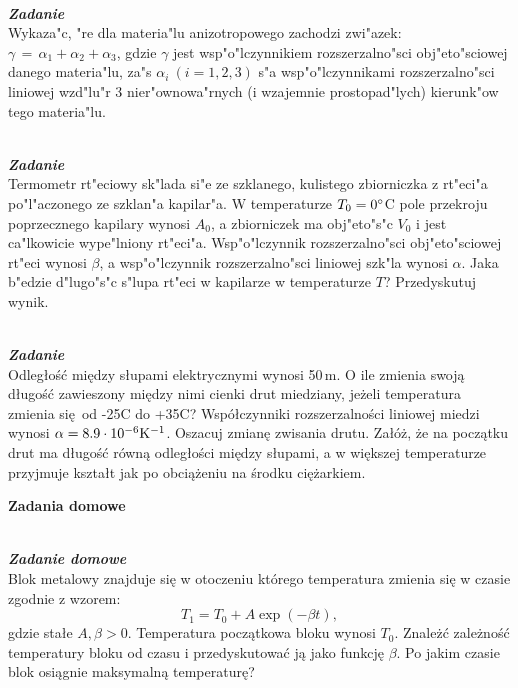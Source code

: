 \documentclass[11pt,a4paper]{article}
\newcounter{zadanie}\newcommand{\zadanie}[1][]{\addtocounter{zadanie}{1} ~\\  {\bf \emph{Zadanie \arabic{zadanie} #1 }} \\}
\newcounter{zaddom}\newcommand{\zaddom}[1][]{\addtocounter{zaddom}{1} ~\\  {\bf \emph{Zadanie domowe \arabic{zaddom} #1 }} \\}
\begin{document}
\zadanie
Wykaza"c, "re dla materia"lu anizotropowego zachodzi zwi"azek:
$\gamma\,=\,\alpha_1+\alpha_2+\alpha_3$, gdzie $\gamma$ jest wsp"o"lczynnikiem rozszerzalno"sci obj"eto"sciowej danego materia"lu, za"s $\alpha_i ~(i=1,2,3)$
s"a wsp"o"lczynnikami rozszerzalno"sci liniowej wzd"lu"r 3 
nier"ownowa"rnych (i wzajemnie prostopad"lych) kierunk"ow tego materia"lu.


\zadanie
Termometr rt"eciowy sk"lada si"e ze szklanego, kulistego zbiorniczka z rt"eci"a po"l"aczonego ze szklan"a kapilar"a. W temperaturze $T_0=0\degree$C
pole przekroju poprzecznego kapilary wynosi $A_0$,
a zbiorniczek ma obj"eto"s"c $V_0$ i jest ca"lkowicie wype"lniony rt"eci"a. Wsp"o"lczynnik rozszerzalno"sci
obj"eto"sciowej rt"eci wynosi $\beta$, a wsp"o"lczynnik rozszerzalno"sci
liniowej szk"la wynosi $\alpha$. Jaka b"edzie d"lugo"s"c s"lupa rt"eci w kapilarze w temperaturze $T$? Przedyskutuj wynik.

\zadanie
Odległość między słupami elektrycznymi wynosi 50\,m.
O ile zmienia swoją długość zawieszony między nimi cienki drut miedziany,
jeżeli temperatura zmienia się od -25\degree C do +35\degree C?
Współczynniki rozszerzalności liniowej miedzi wynosi $\alpha = 8.9\cdot 10^{-6} {\rm K}^{-1}$.
Oszacuj zmianę zwisania drutu. Załóż, że na początku drut ma długość równą
odległości między słupami, a w większej temperaturze przyjmuje kształt
jak po obciążeniu na środku ciężarkiem.

\vskip 10pt





\vspace*{5mm}
\begin{centering}
\bf{ Zadania domowe } \\[1mm]
\end{centering}

\zaddom 
Blok metalowy znajduje się w otoczeniu
którego temperatura zmienia się w czasie zgodnie z wzorem:\\
\[T_1=T_0+A\exp(-\beta t),\] gdzie stałe $A,\beta>0$. 
Temperatura początkowa bloku wynosi $T_0$. Znależć zależność
temperatury bloku od czasu i przedyskutować ją jako funkcję
$\beta$. Po jakim czasie blok osiągnie maksymalną
temperaturę?
\end{document}
